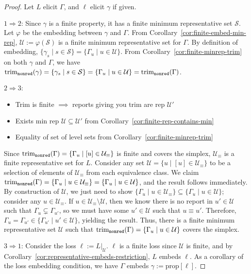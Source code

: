 \documentclass[11pt]{article}
\newcommand{\prop}[1]{\mathrm{prop}[#1]}
\newcommand{\Sc}{\mathcal{S}}
\newcommand{\U}{\mathcal{U}}
\newcommand{\trimnonred}{\mathrm{trim}_{{\tt nonred}}}
\begin{document}
\begin{proof}
Let $L$ elicit $\Gamma$, and $\ell$ elicit $\gamma$ if given.

$1 \Rightarrow 2$:
Since $\gamma$ is a finite property, it has a finite minimum representative set $\Sc$.
Let $\varphi$ be the embedding between $\gamma$ and $\Gamma$.
From Corollary~\ref{cor:finite-embed-min-rep}, $\U := \varphi(\Sc)$ is a finite minimum representative set for $\Gamma$.
By definition of embedding, $\{\gamma_s \mid s\in\Sc\} = \{\Gamma_u \mid u\in\U\}$.
From Corollary~\ref{cor:finite-minrep-trim} on both $\gamma$ and $\Gamma$, we have $\trimnonred(\gamma) = \{\gamma_s \mid s\in\Sc\} = \{\Gamma_u \mid u\in\U\} = \trimnonred(\Gamma)$.


$2 \Rightarrow 3$:
\begin{itemize}
\item Trim is finite $\implies$ reports giving you trim are rep $\U'$
\item Exists min rep $\U \subseteq \U'$ from Corollary~\ref{cor:finite-rep-contains-min}
\item Equality of set of level sets from Corollary~\ref{cor:finite-minrep-trim}
\end{itemize}
Since $\trimnonred(\Gamma) = \{\Gamma_u \mid [u] \in \U_\equiv \}$ is finite and covers the simplex, $\U_\equiv$ is a finite representative set for $L$.
Consider any set $\U = \{u \mid [u] \in \U_\equiv\}$ to be a selection of elements of $\U_\equiv$ from each equivalence class.
We claim $\trimnonred(\Gamma) = \{\Gamma_u \mid u \in \U_\equiv\} = \{\Gamma_u \mid u \in \U\}$, and the result follows immediately.
By construction of $\U$, we just need to show $\{\Gamma_u \mid u \in \U_\equiv\} \subseteq \{\Gamma_u \mid u \in \U\}$; consider any $u \in \U_\equiv$.
If $u \in \U_\equiv \setminus \U$, then we know there is no report in $u' \in \U$ such that $\Gamma_{u} \subsetneq \Gamma_{u'}$, so we must have some $u' \in \U$ such that $u \equiv u'$.
Therefore, $\Gamma_u = \Gamma_{u'} \in \{\Gamma_{u'} \mid u' \in \U\}$, yielding the result.
Thus, there is a finite minimum representative set $\U$ such that $\trimnonred(\Gamma) = \{\Gamma_u \mid u \in \U\}$ covers the simplex.


$3 \Rightarrow 1$:
Consider the loss $\ell := L|_\U$.
$\ell$ is a finite loss since $\U$ is finite, and by Corollary~\ref{cor:representative-embeds-restriction}, $L$ embeds $\ell$.
As a corollary of the loss embedding condition, we have $\Gamma$ embeds $\gamma := \prop{\ell}$.


\end{proof}
\end{document}
